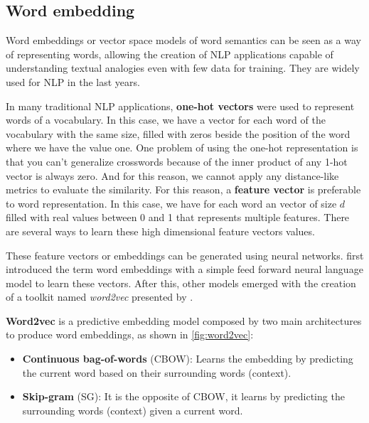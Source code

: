 \subsection{Word embedding}

Word embeddings or vector space models of word semantics can be seen as a way of representing words, allowing the creation of NLP applications capable of understanding textual analogies even with few data for training. They are widely used for NLP in the last years.


In many traditional NLP applications, \textbf{one-hot vectors} were used to represent words of a vocabulary. In this case, we have a vector for each word of the vocabulary with the same size, filled with zeros beside the position of the word where we have the value one. 
One problem of using the one-hot representation is that you can't generalize crosswords because of the inner product of any 1-hot vector is always zero. And for this reason, we cannot apply any distance-like metrics to evaluate the similarity. For this reason, a \textbf{feature vector} is preferable to word representation. In this case, we have for each word an vector of size $d$ filled with real values between 0 and 1 that represents multiple features. There are several ways to learn these high dimensional feature vectors values. 

These feature vectors or embeddings can be generated using neural networks.  first introduced the term word embeddings with a simple feed forward neural language model to learn these vectors. After this, other models emerged with the creation of a toolkit named \textit{word2vec} presented by .

\textbf{Word2vec} is a predictive embedding model composed by two main architectures to produce word embeddings, as shown in \autoref{fig:word2vec}:

\begin{itemize}
    \item \textbf{Continuous bag-of-words} (CBOW): Learns the embedding by predicting the current word based on their surrounding words (context).
    \item \textbf{Skip-gram} (SG): It is the opposite of CBOW, it learns by predicting the surrounding words (context) given a current word.
\end{itemize}

